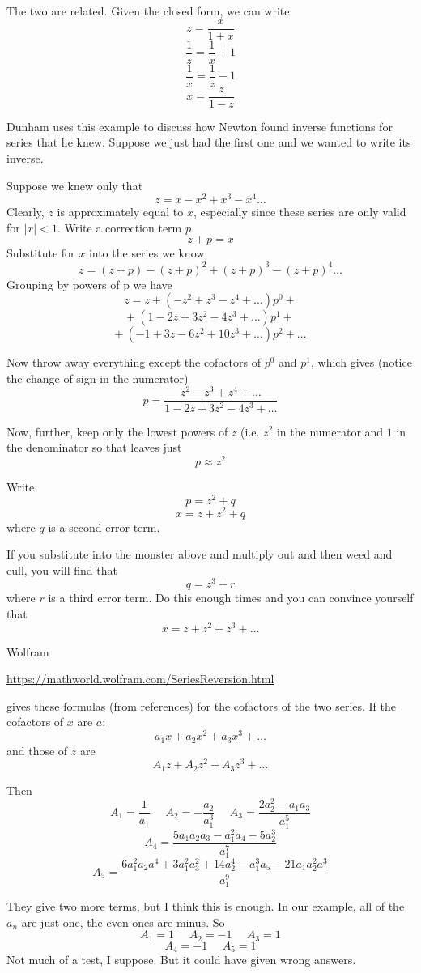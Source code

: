 \documentclass[11pt, oneside]{article}
\begin{document}
The two are related.  Given the closed form, we can write:
\[ z = \frac{x}{1 + x} \]
\[ \frac{1}{z} = \frac{1}{x} + 1 \]
\[ \frac{1}{x}  = \frac{1}{z} - 1 \]
\[ x = \frac{z}{1 - z} \]

Dunham uses this example to discuss how Newton found inverse functions for series that he knew.  Suppose we just had the first one and we wanted to write its inverse.  

Suppose we knew only that
\[ z =  x - x^2 + x^3 - x^4 \dots \]
Clearly, $z$ is approximately equal to $x$, especially since these series are only valid for $|x| < 1$.  Write a correction term $p$.
\[ z + p = x \]
Substitute for $x$ into the series we know
\[ z = (z + p) - (z + p)^2 + (z + p)^3 - (z + p)^4 \dots \]
Grouping by powers of p we have
\[ z = z +  (-z^2 + z^3 - z^4 + \dots)p^0 + \]
\[ + \ (1 - 2z + 3z^2 - 4z^3 + \dots)p^1 +  \]
\[ + \ (-1 + 3z - 6z^2 + 10z^3 + \dots)p^2 + \dots \]

Now throw away everything except the cofactors of $p^0$ and $p^1$, which gives (notice the change of sign in the numerator)
\[ p = \frac{z^2 - z^3 + z^4 + \dots}{1 - 2z + 3z^2 - 4z^3 + \dots} \]

 Now, further, keep only the lowest powers of $z$ (i.e. $z^2$ in the numerator and $1$ in the denominator so that leaves just
 \[ p \approx z^2 \]

Write
\[ p = z^2 + q \]
\[ x = z + z^2 + q \]
where $q$ is a second error term.

If you substitute into the monster above and multiply out and then weed and cull, you will find that
\[ q = z^3 + r \]
where $r$ is a third error term.  Do this enough times and you can convince yourself that 
\[ x = z + z^2 + z^3 + \dots \]

Wolfram

\url{https://mathworld.wolfram.com/SeriesReversion.html}

gives these formulas (from references) for the cofactors of the two series.  If the cofactors of $x$ are $a$:
\[ a_1x + a_2x^2 + a_3x^3 + \dots \]
and those of $z$ are
\[ A_1z + A_2z^2 + A_3z^3 + \dots \]

Then
\[ A_1 = \frac{1}{a_1}  \ \ \ \ \ \  A_2 = - \frac{a_2}{a_1^3}  \ \ \ \ \ \  A_3 = \frac{2a_2^2 - a_1a_3}{a_1^5} \]
\[ A_4 = \frac{5 a_1 a_2 a_3 - a_1^2 a_4 - 5 a_2^3}{a_1^7} \]
\[ A_5 = \frac{6a_1^2 a_2 a^4 + 3a_1^2a_3^2 + 14a_2^4 - a_1^3a_5 - 21 a_1a_2^2a^3}{a_1^9} \]

They give two more terms, but I think this is enough.  In our example, all of the $a_n$ are just one, the even ones are minus.  So
\[ A_1 = 1 \ \ \ \ \ \ A_2 = -1 \ \ \ \ \ \ A_3 = 1 \]
\[ A_4 = -1 \ \ \ \ \ \ A_5 = 1 \]
Not much of a test, I suppose.  But it could have given wrong answers.
\end{document}
